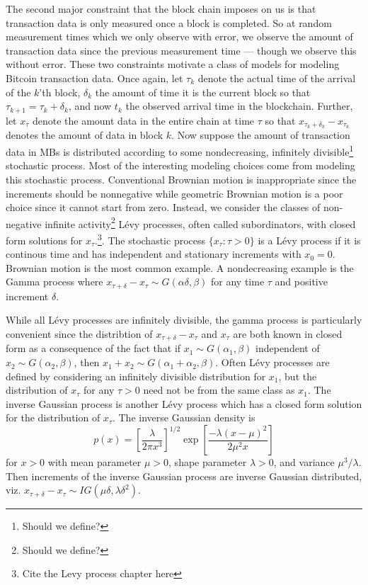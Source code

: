 \documentclass{article}
\begin{document}
The second major constraint that the block chain imposes on us is that transaction data is only measured once a block is completed. So at random measurement times which we only observe with error, we observe the amount of transaction data since the previous measurement time --- though we observe this without error. These two constraints motivate a class of models for modeling Bitcoin transaction data. Once again, let $\tau_k$ denote the actual time of the arrival of the $k$'th block, $\delta_k$ the amount of time it is the current block so that $\tau_{k+1}=\tau_k + \delta_k$, and now $t_k$ the observed arrival time in the blockchain. Further, let $x_\tau$ denote the amount data in the entire chain at time $\tau$ so that $x_{\tau_{k} + \delta_k} - x_{\tau_k}$ denotes the amount of data in block $k$. Now suppose the amount of transaction data in MBs is distributed according to some nondecreasing, infinitely divisible\footnote{Should we define?} stochastic process. Most of the interesting modeling choices come from modeling this stochastic process. Conventional Brownian motion is inappropriate since the increments should be nonnegative while geometric Brownian motion is a poor choice since it cannot start from zero. Instead, we consider the classes of non-negative infinite activity\footnote{Should we define?} L\'{e}vy processes, often called subordinators, with closed form solutions for $x_{\tau}$.\footnote{Cite the Levy process chapter here}. The stochastic process $\{x_{\tau}:\tau>0\}$ is a L\'{e}vy process if it is continous time and has independent and stationary increments with $x_0=0$. Brownian motion is the most common example. A nondecreasing example is the Gamma process where $x_{\tau + \delta} - x_{\tau} \sim G(\alpha \delta, \beta)$ for any time $\tau$ and positive increment $\delta$. 

While all L\'{e}vy processes are infinitely divisible, the gamma process is particularly convenient since the distribtion of $x_{\tau+\delta} - x_\tau$ and $x_\tau$ are both known in closed form as a consequence of the fact that if $x_1\sim G(\alpha_1,\beta)$ independent of $x_2\sim G(\alpha_2,\beta)$, then $x_1+x_2 \sim G(\alpha_1 + \alpha_2, \beta)$. Often L\'{e}vy processes are defined by considering an infinitely divisible distribution for $x_1$, but the distribution of $x_{\tau}$ for any $\tau>0$ need not be from the same class as $x_1$. The inverse Gaussian process is another L\'{e}vy process which has a closed form solution for the distribution of $x_\tau$. The inverse Gaussian density is
\[
p(x) = \left[\frac{\lambda}{2\pi x^3}\right]^{1/2}\exp\left[\frac{-\lambda(x - \mu)^2}{2\mu^2x}\right]
\]
for $x>0$ with mean parameter $\mu>0$, shape parameter $\lambda>0$, and variance $\mu^3/\lambda$. Then increments of the inverse Gaussian process are inverse Gaussian distributed, viz. $x_{\tau + \delta} - x_\tau \sim IG(\mu\delta,\lambda\delta^2)$.
\end{document}
